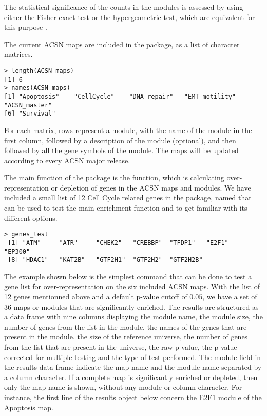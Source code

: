 \documentclass[article]{jss}
\begin{document}
The statistical significance of the counts in the modules is assessed by using
either the Fisher exact test \citep{fisher1922interpretation,
fisher1934statistical} or the hypergeometric test, which are equivalent for this
purpose \citep{rivals2007enrichment}.

The current ACSN maps are included in the  package, as a list of character matrices.

\begin{verbatim}
> length(ACSN_maps)
[1] 6
> names(ACSN_maps)
[1] "Apoptosis"    "CellCycle"    "DNA_repair"   "EMT_motility" "ACSN_master" 
[6] "Survival"    
\end{verbatim}

For each matrix, rows represent a module, with the name of the module in the
first column, followed by a description of the module (optional), and then
followed by all the gene symbols of the module. The maps will be updated
according to every ACSN major release.

The main function of the  package is the 
function, which is calculating over-representation or depletion of genes in the
ACSN maps and modules. We have included a small list of 12 Cell Cycle related
genes in the package, named  that can be used to test the main
enrichment function and to get familiar with its different options.

\begin{verbatim}
> genes_test
 [1] "ATM"     "ATR"     "CHEK2"   "CREBBP"  "TFDP1"   "E2F1"    "EP300"  
 [8] "HDAC1"   "KAT2B"   "GTF2H1"  "GTF2H2"  "GTF2H2B"
\end{verbatim}

The example shown below is the simplest command that can be done to test a gene
list for over-representation on the six included ACSN maps. With the list of 12
genes mentionned above and a default p-value cutoff of $0.05$, we have a set of
36 maps or modules that are significantly enriched. The results are structured
as a data frame with nine columns displaying the module name, the module size,
the number of genes from the list in the module, the names of the genes that are
present in the module, the size of the reference universe, the number of genes
from the list that are present in the universe, the raw p-value, the p-value
corrected for multiple testing and the type of test performed. The module field
in the results data frame indicate the map name and the module name separated by
a column character. If a complete map is significantly enriched or depleted,
then only the map name is shown, without any module or column character. For
instance, the first line of the results object below concern the E2F1 module of
the Apoptosis map. 
\end{document}
